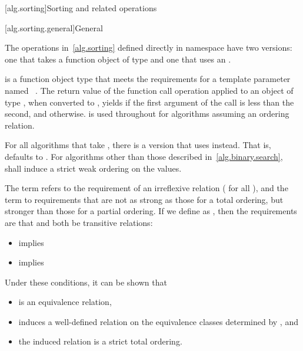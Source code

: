 [alg.sorting]{Sorting and related operations}

[alg.sorting.general]{General}

\pnum
The operations in~\ref{alg.sorting} defined directly in namespace 
have two versions:
one that takes a function object of type  and
one that uses an .

\pnum
{} is a function object type
that meets the requirements for a template parameter
named ~.
The return value of the function call operation
applied to an object of type ,
when converted to ,
yields 
if the first argument of the call is less than the second, and
 otherwise.
 is used throughout
for algorithms assuming an ordering relation.

\pnum
For all algorithms that take ,
there is a version that uses  instead.
That is,  defaults to .
For algorithms other than those described in~\ref{alg.binary.search},
 shall induce a strict weak ordering on the values.

\pnum
The term  refers to the requirement
of an irreflexive relation ( for all ),
and the term  to requirements
that are not as strong as those for a total ordering,
but stronger than those for a partial ordering.
If we define  as ,
then the requirements are that  and 
both be transitive relations:

\begin{itemize}
\item {} implies 
\item {} implies 
\end{itemize}
\begin{note}
Under these conditions, it can be shown that
\begin{itemize}
\item
   is an equivalence relation,
\item
   induces a well-defined relation
  on the equivalence classes determined by , and
\item
  the induced relation is a strict total ordering.
\end{itemize}
\end{note}

